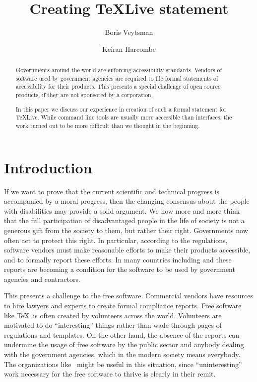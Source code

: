 \documentclass{ltugboat}
\title{Creating \TeX Live \acro{VPAT}\textsuperscript{\textregistered} statement}
\author{Boris Veytsman}
\author{Keiran Harcombe}
\begin{document}
\maketitle

\begin{abstract}
  Governments around the world are enforcing accessibility standards.
  Vendors of software used by government agencies are required to file
  formal statements of accessibility for their products.  This
  presents a special challenge of open source products, if they are
  not sponsored by a corporation.

  In this paper we discuss our experience in creation of such a formal
  statement for \TeX Live.  While command line tools are usually more
  accessible than  interfaces, the work turned out to be
  more difficult than we thought in the beginning.
\end{abstract}

\section{Introduction}
\label{sec:introduction}

If we want to prove that the current scientific and technical progress
is accompanied by a moral progress, then the changing consensus about
the people with disabilities may provide a solid argument.  We now
more and more think that the full participation of disadvantaged
people in the life of society is not a generous gift from the society
to them, but rather their right.  Governments now often act to protect
this right.  In particular, according to the regulations, software
vendors must make reasonable efforts to make their products
accessible, and to formally report these efforts.  In many countries
including  and  these reports are becoming a
condition for the software to be used by government agencies and
contractors.  

This presents a challenge to the free software.  Commercial vendors
have resources to hire lawyers and experts to create formal compliance
reports.  Free software like \TeX\ is often created by volunteers
across the world.  Volunteers are motivated to do ``interesting''
things rather than wade through pages of regulations and templates.
On the other hand, the absence of the reports can undermine the usage
of free software by the public sector and anybody dealing with the
government agencies, which in the modern society means everybody.  The
organizations like \tug\ might be useful in this situation, since
``uninteresting'' work necessary for the free software to thrive is
clearly in their remit.
\end{document}
